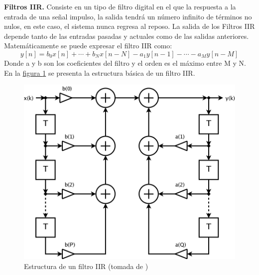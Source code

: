 \documentclass[11pt,lettersize]{article} %
\newcommand{\figura}[1]{\hyperref[{#1}]{figura \ref*{#1}}}
\begin{document}
\textbf{Filtros IIR.}
Consiste en un tipo de filtro digital en el que la respuesta a la entrada de una señal impulso, la salida tendrá un número infinito de términos no nulos, en este caso, el sistema nunca regresa al
reposo. La salida de los Filtros IIR depende tanto de las entradas pasadas y actuales como de las salidas anteriores. Matemáticamente se puede expresar el filtro IIR como:
\begin{equation}
	y[n] = b_{0}x[n] + \cdots + b_{N}x[n-N] - a_{1}y[n-1] - \cdots - a_{M}y[n-M]
\end{equation}
Donde a y b son los coeficientes del filtro y el orden es el máximo entre M y N. En la \figura{F-IIR} se presenta la estructura básica de un filtro IIR.
\begin{figure}[h!]
	\centering
	\includegraphics[width=.8\textwidth]{images/IIR.png}
	\caption[Estructura de un filtro IIR]{Estructura de un filtro IIR (tomada de \cite{WikiIIR})}
	\label{F-IIR}
\end{figure}
\end{document}
